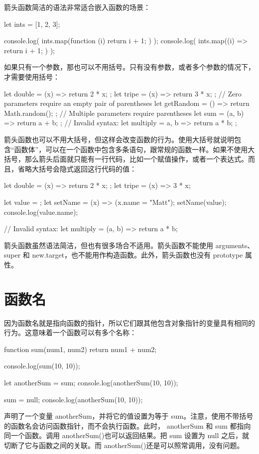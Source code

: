 箭头函数简洁的语法非常适合嵌入函数的场景：
\begin{js}
let ints = [1, 2, 3];

console.log(
  ints.map(function (i) {
    return i + 1;
  })
);
console.log(
  ints.map((i) => {
    return i + 1;
  })
);
\end{js}
如果只有一个参数，那也可以不用括号。只有没有参数，或者多个参数的情况下，才需要使用括号：
\begin{js}
let double = (x) => {
  return 2 * x;
};
let tripe = (x) => {
  return 3 * x;
};
// Zero parameters require an empty pair of parentheses
let getRandom = () => {
  return Math.random();
};
// Multiple parameters require parentheses
let sum = (a, b) => {
  return a + b;
};
// Invalid syntax:
let multiply = a, b => { 
    return a * b;
};
\end{js}
箭头函数也可以不用大括号，但这样会改变函数的行为。使用大括号就说明包含“函数体”，可以在一个函数中包含多条语句，跟常规的函数一样。如果不使用大括号，那么箭头后面就只能有一行代码，比如一个赋值操作，或者一个表达式。而且，省略大括号会隐式返回这行代码的值：
\begin{js}
let double = (x) => {
  return 2 * x;
};
let tripe = (x) => 3 * x;

let value = {};
let setName = (x) => (x.name = "Matt");
setName(value);
console.log(value.name);

// Invalid syntax:
let multiply = (a, b) => return a * b;
\end{js}

箭头函数虽然语法简洁，但也有很多场合不适用。箭头函数不能使用 arguments、super 和 new.target，也不能用作构造函数。此外，箭头函数也没有 prototype 属性。

\section{函数名}
因为函数名就是指向函数的指针，所以它们跟其他包含对象指针的变量具有相同的行为。这意味着一个函数可以有多个名称：
\begin{js}
function sum(num1, num2) {
  return num1 + num2;
}

console.log(sum(10, 10));

let anotherSum = sum;
console.log(anotherSum(10, 10));

sum = null;
console.log(anotherSum(10, 10));
\end{js}

声明了一个变量 anotherSum，并将它的值设置为等于 sum。注意，使用不带括号的函数名会访问函数指针，而不会执行函数。此时， anotherSum 和 sum 都指向同一个函数。调用 anotherSum()也可以返回结果。把 sum 设置为 null 之后，就切断了它与函数之间的关联。而 anotherSum()还是可以照常调用，没有问题。

